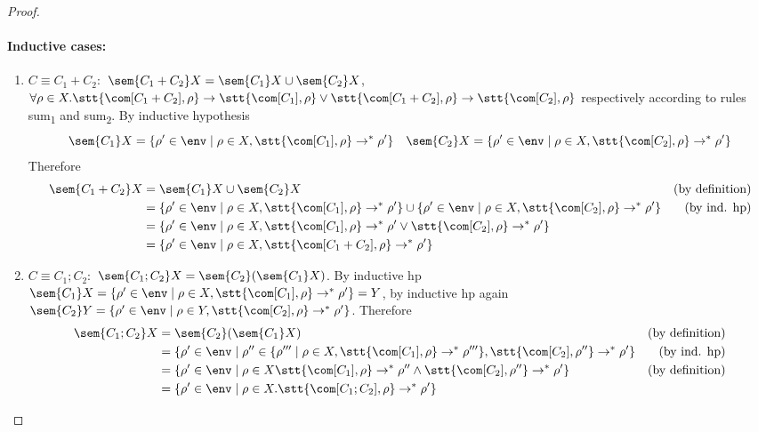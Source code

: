 \begin{proof}
  \paragraph*{Inductive cases:\\}
  \begin{enumerate}
  \item \(C \equiv C_1 + C_2:\) \(\sem{C_1 + C_2}X = \sem{C_1}X \cup
    \sem{C_2}X\), \(\forall \rho \in X . \stt{\com[C_1 + C_2], \rho} \to
    \stt{\com[C_1], \rho} \vee \stt{\com[C_1 + C_2], \rho} \to \stt{\com[C_2], \rho}\)
    respectively according to rules sum\textsubscript{1} and
    sum\textsubscript{2}. By inductive hypothesis \[\sem{C_1}X =
    \{\rho' \in\env \mid \rho \in X , \stt{\com[C_1],\rho} \to^* \rho'\} \quad
    \sem{C_2}X = \{\rho' \in\env \mid \rho \in X , \stt{\com[C_2],\rho} \to^*
    \rho'\}\] Therefore
    \begin{align*}
      \sem{C_1 + C_2}X & = \sem{C_1}X \cup \sem{C_2}X & \text{(by definition)}\\
      & = \{\rho' \in\env \mid \rho \in X , \stt{\com[C_1],\rho} \to^* \rho'\} \cup \{\rho' \in\env \mid \rho \in X , \stt{\com[C_2],\rho} \to^* \rho'\} & \text{(by ind. hp)}\\
      & = \{\rho' \in\env \mid \rho \in X, \stt{\com[C_1],\rho} \to^* \rho' \vee \stt{\com[C_2],\rho} \to^* \rho'\} \\
      & = \{\rho' \in\env \mid \rho \in X, \stt{\com[C_1 + C_2], \rho} \to^* \rho'\}
    \end{align*}
  \item \(C \equiv C_1;C_2:\) \(\sem{C_1;C_2}X =
    \sem{C_2}(\sem{C_1}X)\). By inductive hp \(\sem{C_1}X = \{\rho'
    \in\env \mid \rho \in X, \stt{\com[C_1], \rho} \to^* \rho'\} = Y\), by inductive
    hp again \(\sem{C_2}Y = \{\rho' \in\env \mid \rho \in Y, \stt{\com[C_2], \rho}
    \to^* \rho'\}\). Therefore
    \begin{align*}
      \sem{C_1;C_2}X & = \sem{C_2}(\sem{C_1}X) & \text{(by definition)}\\
      & = \{\rho' \in\env \mid \rho'' \in \{\rho''' \mid \rho \in X, \stt{\com[C_1], \rho}  \to^* \rho'''\}, \stt{\com[C_2], \rho''} \to^* \rho'\} & \text{(by ind. hp)}\\
      & = \{\rho' \in\env \mid \rho \in X \stt{\com[C_1], \rho} \to^* \rho'' \wedge \stt{\com[C_2], \rho''} \to^* \rho'\} & \text{(by definition)}\\
      & = \{\rho' \in\env \mid \rho \in X . \stt{\com[C_1;C_2], \rho} \to^* \rho'\}
    \end{align*}

\end{enumerate}
\end{proof}
